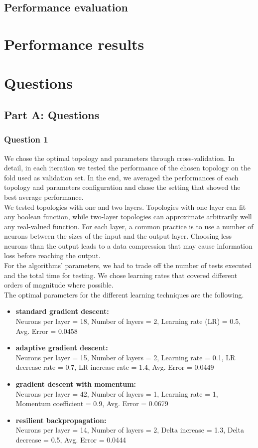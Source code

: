 \documentclass{article}
\begin{document}
\subsection{Performance evaluation}


\section{Performance results}



\section{Questions}
\subsection{Part A: Questions}
\subsubsection{Question 1}
We chose the optimal topology and parameters through cross-validation. In detail, in each iteration we tested the performance of the chosen topology on the fold used as validation set. In the end, we averaged the performances of each topology and parameters configuration and chose the setting that showed the best average performance.\\
We tested topologies with one and two layers. Topologies with one layer can fit any boolean function, while two-layer topologies can approximate arbitrarily well any real-valued function. For each layer, a common practice is to use a number of neurons between the sizes of the input and the output layer. Choosing less neurons than the output leads to a data compression that may cause information loss before reaching the output.\\
For the algorithms' parameters, we had to trade off the number of tests executed and the total time for testing. We chose learning rates that covered different orders of magnitude where possible.\\
The optimal parameters for the different learning techniques are the following.
\begin{itemize}
\item \textbf{standard gradient descent:} \\ Neurons per layer = 18, Number of layers = 2, Learning rate (LR) = 0.5, Avg. Error = 0.0458
\item \textbf{adaptive gradient descent:}\\ Neurons per layer = 15, Number of layers = 2, Learning rate = 0.1, LR decrease rate = 0.7, LR increase rate = 1.4, Avg. Error = 0.0449
\item \textbf{gradient descent with momentum:}\\ Neurons per layer = 42, Number of layers = 1, Learning rate = 1, Momentum coefficient = 0.9, Avg. Error = 0.0679
\item \textbf{resilient backpropagation:}\\ Neurons per layer = 14, Number of layers = 2, Delta increase = 1.3, Delta decrease = 0.5, Avg. Error = 0.0444
\end{itemize}
\end{document}

